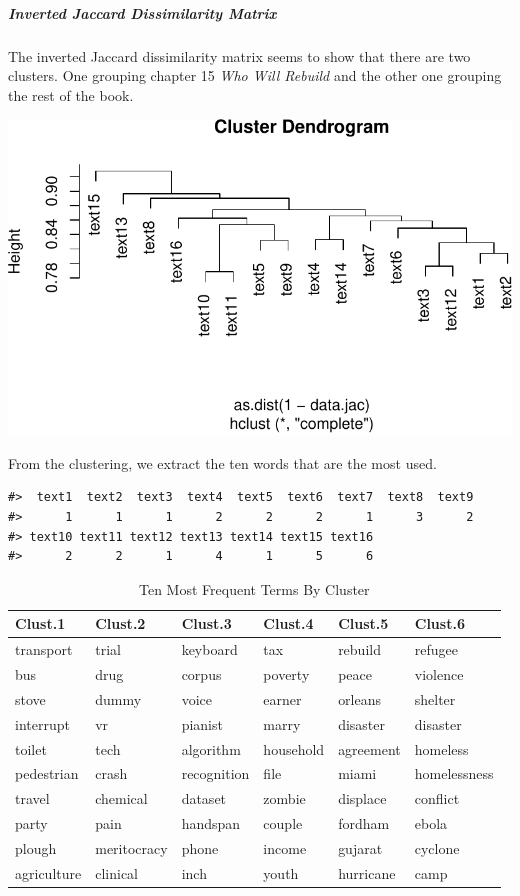 \documentclass[
]{article}
\begin{document}
\hypertarget{inverted-jaccard-dissimilarity-matrix}{%
\subparagraph{Inverted Jaccard Dissimilarity
Matrix}\label{inverted-jaccard-dissimilarity-matrix}}

The inverted Jaccard dissimilarity matrix seems to show that there are
two clusters. One grouping chapter 15 \emph{Who Will Rebuild} and the
other one grouping the rest of the book.

\begin{center}\includegraphics[width=0.7\linewidth]{report_files/figure-latex/Jaccard inverted-1} \end{center}

From the clustering, we extract the ten words that are the most used.

\begin{verbatim}
#>  text1  text2  text3  text4  text5  text6  text7  text8  text9 
#>      1      1      1      2      2      2      1      3      2 
#> text10 text11 text12 text13 text14 text15 text16 
#>      2      2      1      4      1      5      6
\end{verbatim}

\begin{table}

\caption{\label{tab:Jaccard cutree}Ten Most Frequent Terms By Cluster}
\centering
\begin{tabular}[t]{l|l|l|l|l|l}
\hline
Clust.1 & Clust.2 & Clust.3 & Clust.4 & Clust.5 & Clust.6\\
\hline
transport & trial & keyboard & tax & rebuild & refugee\\
\hline
bus & drug & corpus & poverty & peace & violence\\
\hline
stove & dummy & voice & earner & orleans & shelter\\
\hline
interrupt & vr & pianist & marry & disaster & disaster\\
\hline
toilet & tech & algorithm & household & agreement & homeless\\
\hline
pedestrian & crash & recognition & file & miami & homelessness\\
\hline
travel & chemical & dataset & zombie & displace & conflict\\
\hline
party & pain & handspan & couple & fordham & ebola\\
\hline
plough & meritocracy & phone & income & gujarat & cyclone\\
\hline
agriculture & clinical & inch & youth & hurricane & camp\\
\hline
\end{tabular}
\end{table}
\end{document}
